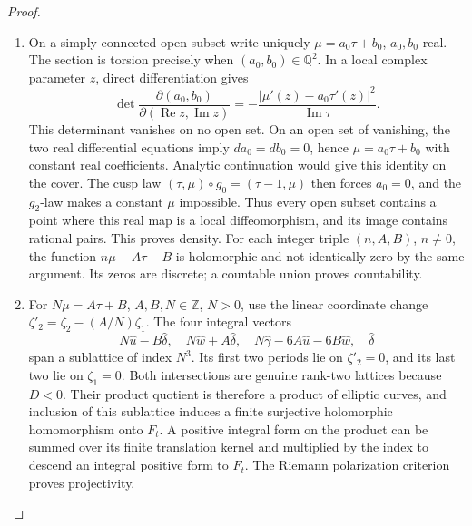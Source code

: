 \begin{proof}
\begin{enumerate}[label=\arabic*.,leftmargin=*]
\item \hypertarget{tag-000F}{}\label{app:rederive:fam-src-D.1.2}
On a simply connected open subset write uniquely
\(\mu=a_0\tau+b_0\), \(a_0,b_0\) real. The section is torsion precisely
when \((a_0,b_0)\in\mathbb Q^2\). In a local complex parameter \(z\), direct
differentiation gives
\[
 \det\frac{\partial(a_0,b_0)}{\partial(\operatorname{Re}z,
 \operatorname{Im}z)}
 =-\frac{|\mu'(z)-a_0\tau'(z)|^2}{\operatorname{Im}\tau}.
\]
This determinant vanishes on no open set. On an open set of vanishing,
the two real differential equations imply \(da_0=db_0=0\), hence
\(\mu=a_0\tau+b_0\) with constant real coefficients. Analytic continuation
would give this identity on the cover. The cusp law
\((\tau,\mu)\circ g_0=(\tau-1,\mu)\) then forces \(a_0=0\), and the
\(g_2\)-law makes a constant \(\mu\) impossible. Thus every open subset
contains a point where this real map is a local diffeomorphism, and its
image contains rational pairs. This proves density. For each integer
triple \((n,A,B)\), \(n\ne0\), the function \(n\mu-A\tau-B\) is
holomorphic and not identically zero by the same argument. Its zeros are
discrete; a countable union proves countability.

\item For \(N\mu=A\tau+B\), \(A,B,N\in\mathbb Z\), \(N>0\), use the linear
coordinate change \(\zeta'_2=\zeta_2-(A/N)\zeta_1\).
The four integral vectors
\[
 N\widehat u-B\widehat\delta,\quad
 N\widehat w+A\widehat\delta,\quad
 N\widehat\gamma-6A\widehat u-6B\widehat w,\quad
 \widehat\delta
\]
span a sublattice of index \(N^3\). Its first two periods lie on
\(\zeta'_2=0\), and its last two lie on \(\zeta_1=0\).
Both intersections are genuine rank-two lattices because \(D<0\).
Their product quotient is therefore a product of elliptic curves, and
inclusion of this sublattice induces a finite surjective holomorphic
homomorphism onto \(F_t\). A positive integral form on the product can
be summed over its finite translation kernel and multiplied by the
index to descend an integral positive form to \(F_t\). The Riemann
polarization criterion proves projectivity.


\end{enumerate}
\end{proof}
